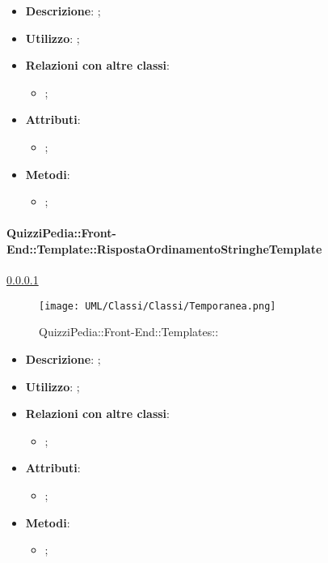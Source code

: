 			\begin{itemize}
				\item \textbf{Descrizione}: ;
				\item \textbf{Utilizzo}: ;
				\item \textbf{Relazioni con altre classi}: 
				\begin{itemize}
					\item ;
				\end{itemize}
				\item \textbf{Attributi}: 
				\begin{itemize}
					\item ;
				\end{itemize}
				\item \textbf{Metodi}: 
				\begin{itemize}
					\item ;
				\end{itemize}
			\end{itemize}
		
		\paragraph{QuizziPedia::Front-End::Template::RispostaOrdinamentoStringheTemplate}
		
				\label{QuizziPedia::Front-End::Templates::}
				\ref{QuizziPedia::Front-End::Templates::}
				\begin{figure}[h]
					\centering
					\texttt{[image: UML/Classi/Classi/Temporanea.png]}
					\caption{QuizziPedia::Front-End::Templates::}
				\end{figure}
				
			\begin{itemize}
				\item \textbf{Descrizione}: ;
				\item \textbf{Utilizzo}: ;
				\item \textbf{Relazioni con altre classi}: 
				\begin{itemize}
					\item ;
				\end{itemize}
				\item \textbf{Attributi}: 
				\begin{itemize}
					\item ;
				\end{itemize}
				\item \textbf{Metodi}: 
				\begin{itemize}
					\item ;
				\end{itemize}
			\end{itemize}
		
